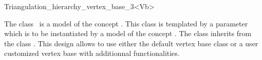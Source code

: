 

\begin{ccRefClass}{Triangulation_hierarchy_vertex_base_3<Vb>}


\ccDefinition
  
The class \ccRefName\ is a model of the concept
.  This class is templated
by a parameter  which is to be instantiated by a model of  the concept
.  The class
 inherits from the class
.  This design allows to use either the default vertex base class or a
user customized vertex base with additionnal functionalities.


\ccIsModel
{}

\ccInheritsFrom
{}

\ccTypes
{}

\ccSeeAlso
{} \\
 \\

\end{ccRefClass}


